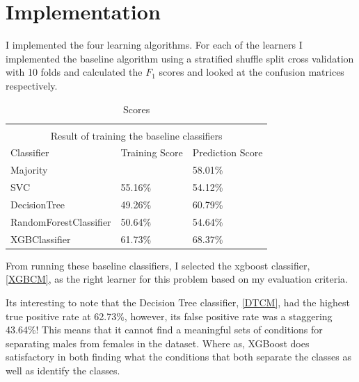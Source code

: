 \section*{Implementation}
I implemented the four learning algorithms. For each of the learners I implemented the baseline algorithm using a stratified shuffle split cross validation with 10 folds and calculated the $F_1$ scores and looked at the confusion matrices respectively. 


\setlength{\extrarowheight}{1.5pt}
\begin{table}[!htbp]
\caption{Scores} %
\centering %
\begin{tabular}{|l|l|l|} %
\hline %


\multicolumn{3}{|c|}{}\\
\multicolumn{3}{|c|}{Result of training the baseline classifiers}\\[5pt]
\hline
Classifier & Training Score & Prediction Score\\[0.5ex]
\hline %

Majority & & 58.01\% \\
SVC     & 55.16\% & 54.12\% \\
DecisionTree       & 49.26\% & 60.79\%\\
RandomForestClassifier   & 50.64\% & 54.64\%\\
XGBClassifier            & 61.73\% & 68.37\%\\

\hline%
\end{tabular}
\label{tableBenchMarkScores}{}
\end{table}

From running these baseline classifiers, I selected the xgboost classifier, \ref{XGBCM}, as the right learner for this problem based on my evaluation criteria.

Its interesting to note that the Decision Tree classifier, \ref{DTCM}, had the highest true positive rate at 62.73\%, however, its false positive rate was a staggering 43.64\%! This means that it cannot find a meaningful sets of conditions for separating males from females in the dataset. Where as, XGBoost does satisfactory in both finding what the conditions that both separate the classes as well as identify the classes.

